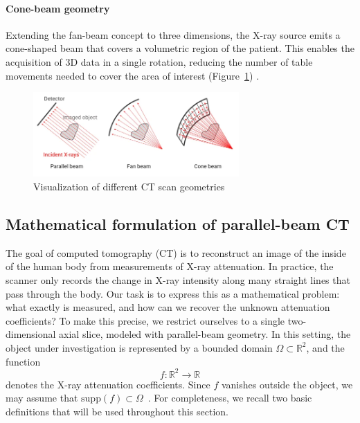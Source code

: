 \documentclass[12pt,a4paper]{article}
\begin{document}
\paragraph{Cone-beam geometry}
Extending the fan-beam concept to three dimensions, the X-ray source emits a cone-shaped beam that covers a volumetric region of the patient. This enables the acquisition of 3D data in a single rotation, reducing the number of table movements needed to cover the area of interest (Figure~\ref{fig5}) \cite{nett2019ctgenerations}.

\begin{figure}[H]
    \centering
    \includegraphics[width=0.7\textwidth]{Bachelorthesis/UsedImages/fig5.png}
    \caption{Visualization of different CT scan geometries}
    \label{fig5}
\end{figure}

\subsection{Mathematical formulation of parallel-beam CT}
\label{Formulation}

The goal of computed tomography (CT) is to reconstruct an image of the inside of the human body from measurements of X-ray attenuation. In practice, the scanner only records the change in X-ray intensity along many straight lines that pass through the body. Our task is to express this as a mathematical problem: what exactly is measured, and how can we recover the unknown attenuation coefficients?
\newline\newline
To make this precise, we restrict ourselves to a single two-dimensional axial slice, modeled with parallel-beam geometry. In this setting, the object under investigation is represented by a bounded domain $\Omega \subset \mathbb{R}^2$, and the function
\[
f : \mathbb{R}^2 \to \mathbb{R}
\]
denotes the X-ray attenuation coefficients. Since $f$ vanishes outside the object, we may assume that $\mathrm{supp}(f) \subset \Omega$~\cite{math_of_ct}. For completeness, we recall two basic definitions that will be used throughout this section.
\end{document}
